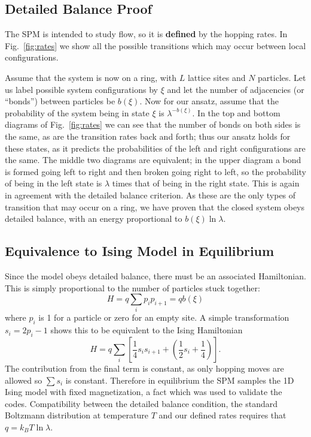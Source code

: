 \documentclass[
reprint, amsmath,amssymb,
]{revtex4-1}
\begin{document}
\subsection{Detailed Balance Proof} 
The SPM is intended to study flow, so it is {\bf defined} by the
hopping rates.  In Fig.~\ref{fig:rates} we
show all the possible transitions which may occur between local
configurations. 

Assume that the system is now on a ring, with $L$
lattice sites and $N$ particles.  Let us label possible system
configurations by $\xi$ and let the number of adjacencies (or
``bonds'') between particles be $b(\xi)$. Now for our ansatz, assume
that the probability of the system being in state $\xi$ is
$\lambda^{-b(\xi)}$.  In the top and bottom diagrams of
Fig.~\ref{fig:rates} we can see that the number of bonds on
both sides is the same, as are the transition rates back and forth;
thus our ansatz holds for these states, as it predicts the
probabilities of the left and right configurations are the same. The
middle two diagrams are equivalent; in the upper diagram a
bond is formed going left to right and then broken going right to
left, so the probability of being in the left state is $\lambda$ times
that of being in the right state. This is again in agreement with the
detailed balance criterion. As these are the only types of transition
that may occur on a ring, we have proven that the closed system obeys
detailed balance, with an energy proportional to $b(\xi) \ln {\lambda}$.

\subsection{Equivalence to Ising Model in Equilibrium}

Since the model obeys detailed balance, there must be an associated
Hamiltonian.  This is simply proportional to the number of particles stuck together:
\begin{equation}
 H = q \sum_i p_ip_{i+1} = q b(\xi)
\end{equation}
where $p_i$ is 1 for a particle or zero for an empty site.  A simple
transformation $s_i = 2p_i-1$ shows this to be equivalent to the Ising
Hamiltonian
\begin{equation}
 H = q \sum_i \left[ \frac{1}{4} s_i s_{i+1} + \left( \frac{1}{2} s_i + \frac{1}{4} \right) \right].
\end{equation}
The contribution from the final term is constant, as only hopping moves are allowed so 
$\sum s_i$ is constant. Therefore in equilibrium the SPM samples the 1D
Ising model with fixed magnetization, a fact which was used to
validate the codes. Compatibility between the detailed balance condition, the standard Boltzmann distribution at temperature $T$ and our defined rates requires that $q = k_B T\ln{\lambda} $.
\end{document}
